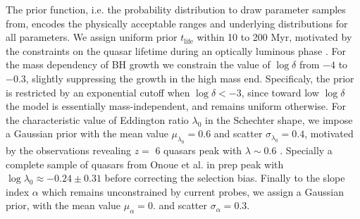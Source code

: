 \documentclass[nolinenumbers,preprint2,tighten]{aastex631}
\newcommand{\tlife}{t_\mathrm{life}}
\newcommand{\blue}[1]{\textcolor{blue}{ #1}}
\begin{document}
\begin{CJK*}{UTF8}{gbsn}
The prior function, i.e. the probability distribution to draw parameter samples from, 
encodes the physically acceptable ranges and underlying distributions for all parameters. 
We assign uniform prior $\tlife$ within 10 to 200 Myr, 
motivated by the constraints on the quasar lifetime during an optically luminous phase \citep[e.g.,][]{2004cbhg.symp..169M}.
For the mass dependency of BH growth we constrain the value of $\log \delta$ from $-4$ to $-0.3$, 
slightly suppressing the growth in the high mass end. 
Specificaly, the prior is restricted by an exponential cutoff when $\log \delta < -3$,
since toward low $\log\delta$ the model is essentially mass-independent,
and remains uniform otherwise. 
For the characteristic value of Eddington ratio $\lambda_0$ in the Schechter shape, 
we impose a Gaussian prior with the mean value $\mu_{\lambda_0}=0.6$ and scatter $\sigma_{\lambda_0}=0.4$, 
motivated by the observations revealing $z=$ 6 quasars peak with $\lambda \sim 0.6$ 
\citep[e.g.,][]{2010AJ....140..546W}.
Specially a complete sample of quasars from Onoue et al. in prep peak with $\log \lambda_0 \approx -0.24 \pm 0.31$ 
before correcting the selection bias. 
Finally to the slope index $\alpha$ which remains unconstrained by current probes,
we assign a Gaussian prior, with the mean value $\mu_{\alpha}=0.$ and scatter $\sigma_{\alpha}=0.3$.
  

\end{CJK*}
\end{document}
